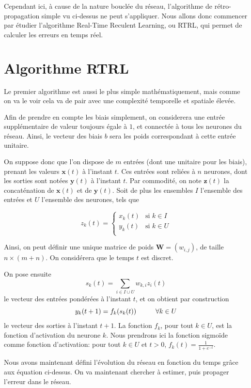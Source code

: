 Cependant ici, à cause de la nature bouclée du réseau, l'algorithme de rétro-propagation simple vu ci-dessus ne peut s'appliquer. Nous allons donc commencer par étudier l'algorithme Real-Time Reculent Learning, ou RTRL, qui permet de calculer les erreurs en temps réel.

\section{Algorithme RTRL}
Le premier algorithme est aussi le plus simple mathématiquement, mais comme on va le voir cela va de pair avec une complexité temporelle et spatiale élevée.

Afin de prendre en compte les biais simplement, on considerera une entrée supplémentaire de valeur toujours égale à $1$, et connectée à tous les neurones du réseau. Ainsi, le vecteur des biais $b$ sera les poids correspondant à cette entrée unitaire.

On suppose donc que l'on dispose de $m$ entrées (dont une unitaire pour les biais), prenant les valeurs $\boldsymbol{x}(t)$ à l'instant $t$. Ces entrées sont reliées à $n$ neurones, dont les sorties sont notées $\boldsymbol{y}(t)$ à l'instant $t$. Par commodité, on note $\boldsymbol{z}(t)$ la concaténation de $\boldsymbol{x}(t)$ et de $\boldsymbol{y}(t)$. Soit de plus les ensembles $I$ l'ensemble des entrées et $U$ l'ensemble des neurones, tels que

\[ z_k(t) = \begin{cases}
                  x_k(t) & \text{si }k \in I\\
                  y_k(t) & \text{si }k \in U\\
                \end{cases}
\]

Ainsi, on peut définir une unique matrice de poids $\boldsymbol{W}=(w_{i,j})$, de taille $n\times(m+n)$. On considérera que le temps $t$ est discret.

On pose ensuite
\[ s_k(t) = \sum_{i \in I \cup U} w_{k,i}z_i(t) \]
le vecteur des entrées pondérées à l'instant $t$, et on obtient par construction
\[ y_k(t+1) = f_k(s_k(t)) \hspace*{1cm} \forall k \in U \]
le vecteur des sorties à l'instant $t+1$. La fonction $f_k$, pour tout $k \in U$, est la fonction d'activation du neurone $k$. Nous prendrons ici la fonction sigmoïde comme fonction d'activation: pour tout $k \in U$ et $t > 0$, $f_k(t) = \frac{1}{1+e^{-t}}$.

Nous avons maintenant défini l'évolution du réseau en fonction du temps grâce aux équation ci-dessus. On va maintenant chercher à estimer, puis propager l'erreur dans le réseau.

